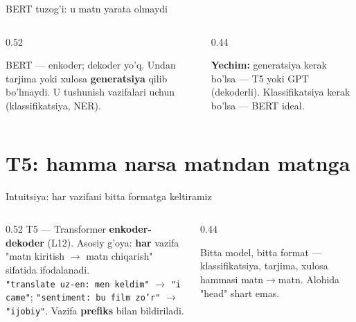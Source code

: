 \documentclass[aspectratio=169,11pt]{beamer}
\begin{document}
\begin{frame}{BERT tuzog'i: u matn yarata olmaydi}
  \begin{columns}[T]
    \begin{column}{0.52\textwidth}
      \begin{tcolorbox}[warnbox,title={Faqat enkoder}]
        \small
        BERT --- enkoder; dekoder yo'q. Undan tarjima yoki xulosa
        \textbf{generatsiya} qilib bo'lmaydi. U tushunish vazifalari uchun
        (klassifikatsiya, NER).
      \end{tcolorbox}
    \end{column}
    \begin{column}{0.44\textwidth}
      \begin{tcolorbox}[okbox,top=2pt,bottom=2pt]
        \footnotesize
        \textbf{Yechim:} generatsiya kerak bo'lsa --- T5 yoki GPT (dekoderli).
        Klassifikatsiya kerak bo'lsa --- BERT ideal.
      \end{tcolorbox}
    \end{column}
  \end{columns}
\end{frame}

\section[T5]{T5: hamma narsa matndan matnga}

\begin{frame}{Intuitsiya: har vazifani bitta formatga keltiramiz}
  \begin{columns}[T]
    \begin{column}{0.52\textwidth}
      \small
      T5 --- Transformer \textbf{enkoder-dekoder} (L12). Asosiy g'oya: \textbf{har}
      vazifa "matn kiritish $\to$ matn chiqarish" sifatida ifodalanadi.\\[5pt]
      \texttt{"translate uz-en: men keldim"} $\to$ \texttt{"i came"};
      \texttt{"sentiment: bu film zo'r"} $\to$ \texttt{"ijobiy"}. Vazifa
      \textbf{prefiks} bilan bildiriladi.
    \end{column}
    \begin{column}{0.44\textwidth}
      \begin{tcolorbox}[okbox,top=2pt,bottom=2pt]
        \footnotesize
        Bitta model, bitta format --- klassifikatsiya, tarjima, xulosa hammasi
        matn$\to$matn. Alohida "head" shart emas.
      \end{tcolorbox}
    \end{column}
  \end{columns}
\end{frame}
\end{document}

